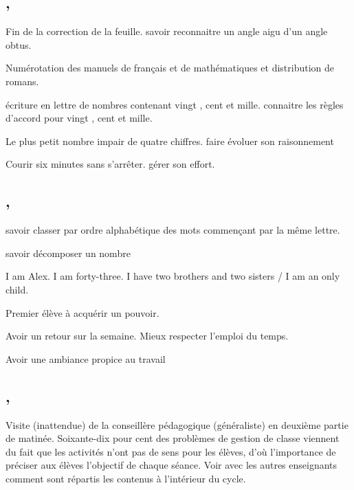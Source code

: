 \documentclass{article}
\begin{document}
	
	\subsection{ \sep}
	\Dis\cma{} Fin de la correction de la feuille.
	\obj savoir reconnaitre un angle aigu d’un angle obtus.
	
	\dIs\cfr{} Numérotation des manuels de français et de mathématiques et distribution de romans.
	
	\dIs\cma{}
	\Ard écriture en lettre de nombres contenant \og vingt \fg{}, \og cent \fg{} et \og mille\fg{}.
	\obj connaitre les règles d’accord pour \og vingt \fg{}, \og cent \fg{} et \og mille\fg{}.
	
	\dIs\cma{} Le plus petit nombre impair de quatre chiffres.
	\obj faire évoluer son raisonnement
	
	\dIs\csp{} Courir six minutes sans s’arrêter.
	\obj gérer son effort.
	
	
	\subsection{ \sep}
	\dis\cfr{}
	\obj savoir classer par ordre alphabétique des mots commençant par la même lettre.
	
	\dis\cma{}
	\obj savoir décomposer un nombre
	
	\Dis\cen{} I am Alex. I am forty-three. I have two brothers and two sisters / I am an only child.
	
	\dIs\cge{} Premier élève à acquérir un pouvoir.
	
	\Dis\chg{}
	\obj Avoir un retour sur la semaine.
	\bil Mieux respecter l’emploi du temps.
	
	\dIs\cge{}
	\obj Avoir une ambiance propice au travail
	
	
	\subsection{ \sep}
	\nte Visite (inattendue) de la conseillère pédagogique (généraliste) en deuxième partie de matinée.
	\bil Soixante-dix pour cent des problèmes de gestion de classe viennent du fait que les activités n’ont pas de sens pour les élèves, d’où l’importance de préciser aux élèves l’objectif de chaque séance. Voir avec les autres enseignants comment sont répartis les contenus à l’intérieur du cycle.
	
\end{document}
